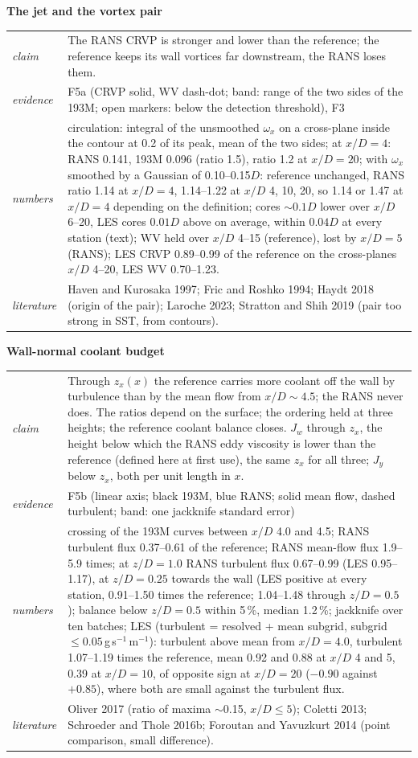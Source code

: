\documentclass[10pt]{article}
\makeatletter
\newcommand{\blk}[5]{\textbf{#1}\par
\begin{tabularx}{\textwidth}{@{}>{\itshape}l X@{}}
claim & #2\\ evidence & #3\\ numbers & #4\\ literature & #5\\
\end{tabularx}\par\smallskip}
\makeatother
\begin{document}
\blk{The jet and the vortex pair}{The RANS CRVP is stronger and lower than the reference; the reference keeps its
wall vortices far downstream, the RANS loses them.}{F5a (CRVP solid, WV dash-dot; band: range of the two sides of
the 193M; open markers: below the detection threshold), F3}{circulation: integral of the unsmoothed $\omega_x$ on
a cross-plane inside the contour at 0.2 of its peak, mean of the two sides; at $x/D=4$: RANS 0.141, 193M 0.096
(ratio 1.5), ratio 1.2 at $x/D=20$; with $\omega_x$ smoothed by a Gaussian of 0.10--0.15$D$: reference unchanged,
RANS ratio 1.14 at $x/D=4$, 1.14--1.22 at $x/D$ 4, 10, 20, so 1.14 or 1.47 at $x/D=4$ depending on the definition;
cores $\sim0.1D$ lower over $x/D$ 6--20, LES cores $0.01D$ above on average, within $0.04D$ at every station (text); WV held over $x/D$ 4--15 (reference), lost by $x/D=5$ (RANS); LES CRVP 0.89--0.99 of
the reference on the cross-planes $x/D$ 4--20, LES WV 0.70--1.23.}{Haven and Kurosaka 1997; Fric and Roshko 1994; Haydt 2018 (origin of the pair); Laroche 2023; Stratton and
Shih 2019 (pair too strong in SST, from contours).}

\blk{Wall-normal coolant budget}{Through $z_x(x)$ the reference carries more coolant off the wall by turbulence than
by the mean flow from $x/D\sim4.5$; the RANS never does. The ratios depend on the surface; the ordering held at
three heights; the reference coolant balance closes. $J_w$ through $z_x$, the height below which the RANS eddy
viscosity is lower than the reference (defined here at first use), the same $z_x$ for all three; $J_y$ below
$z_x$, both per unit length in $x$.}{F5b (linear axis; black 193M, blue RANS; solid mean flow,
dashed turbulent; band: one jackknife standard error)}{crossing of the 193M curves between $x/D$ 4.0 and 4.5; RANS
turbulent flux 0.37--0.61 of the reference; RANS mean-flow flux 1.9--5.9 times; at $z/D=1.0$ RANS turbulent flux
0.67--0.99 (LES 0.95--1.17), at $z/D=0.25$ towards the wall (LES positive at every station, 0.91--1.50 times the
reference; 1.04--1.48 through $z/D=0.5$); balance below $z/D=0.5$ within 5\,\%, median 1.2\,\%; jackknife over ten
batches; LES (turbulent = resolved + mean subgrid, subgrid $\le0.05$\,g\,s$^{-1}$\,m$^{-1}$): turbulent above mean
from $x/D=4.0$, turbulent 1.07--1.19 times the reference, mean 0.92 and 0.88 at $x/D$ 4 and 5, 0.39 at
$x/D=10$, of opposite sign at $x/D=20$ ($-0.90$ against $+0.85$), where both are small against the turbulent
flux.}{Oliver 2017 (ratio of maxima $\sim$0.15, $x/D\le5$); Coletti 2013; Schroeder and Thole 2016b; Foroutan and
Yavuzkurt 2014 (point comparison, small difference).}
\end{document}
